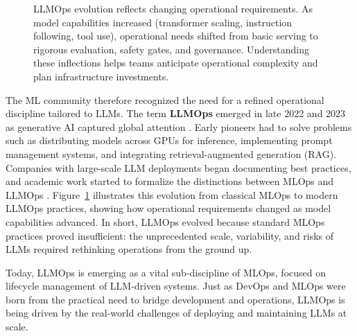 \begin{figure}[t]
\begin{llmfigbox}
\begin{tikzpicture}
\end{tikzpicture}
\end{llmfigbox}

\caption{LLMOps evolution reflects changing operational requirements. As model capabilities increased (transformer scaling, instruction following, tool use), operational needs shifted from basic serving to rigorous evaluation, safety gates, and governance. Understanding these inflections helps teams anticipate operational complexity and plan infrastructure investments.}
\label{fig:ch01_mlops_llmops_timeline}
\end{figure}

The ML community therefore recognized the need for a refined operational discipline tailored to LLMs. The term \textbf{LLMOps} emerged in late 2022 and 2023 as generative AI captured global attention \cite{opendatascience}. Early pioneers had to solve problems such as distributing models across GPUs for inference, implementing prompt management systems, and integrating retrieval-augmented generation (RAG). Companies with large-scale LLM deployments began documenting best practices, and academic work started to formalize the distinctions between MLOps and LLMOps \cite{mdpi}. Figure~\ref{fig:ch01_mlops_llmops_timeline} illustrates this evolution from classical MLOps to modern LLMOps practices, showing how operational requirements changed as model capabilities advanced. In short, LLMOps evolved because standard MLOps practices proved insufficient: the unprecedented scale, variability, and risks of LLMs required rethinking operations from the ground up.

Today, LLMOps is emerging as a vital sub-discipline of MLOps, focused on lifecycle management of LLM-driven systems. Just as DevOps and MLOps were born from the practical need to bridge development and operations, LLMOps is being driven by the real-world challenges of deploying and maintaining LLMs at scale.


